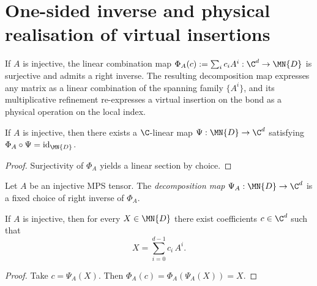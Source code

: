 \section{One-sided inverse and physical realisation of virtual insertions}%
\label{sec:decomposition_map}

If $A$ is injective, the linear combination map
$\Phi_A(c) := \sum_{i} c_i A^i : \C^d \to \MN{D}$
is surjective and admits a right inverse. The resulting decomposition map
expresses any matrix as a linear combination of the spanning family
$\{A^i\}$, and its multiplicative refinement re-expresses a virtual insertion
on the bond as a physical operation on the local index.

\begin{lemma}\label{lem:exists_rightInverse}
    \leanok
    If $A$ is injective, then there exists a $\C$-linear map
    $\Psi : \MN{D} \to \C^d$ satisfying
    $\Phi_A \circ \Psi = \mathrm{id}_{\MN{D}}$.
\end{lemma}

\begin{proof}
    \leanok
    Surjectivity of $\Phi_A$ yields a linear section by choice.
\end{proof}

\begin{definition}\label{def:decomposition_map}
    \leanok
    Let $A$ be an injective MPS tensor.
    The \emph{decomposition map} $\Psi_A : \MN{D} \to \C^d$ is a
    fixed choice of right inverse of $\Phi_A$.
\end{definition}

\begin{lemma}\label{lem:exists_decomposition}
    \leanok
    If $A$ is injective, then for every $X \in \MN{D}$ there exist
    coefficients $c \in \C^d$ such that
    \[
        X = \sum_{i=0}^{d-1} c_i\, A^i.
    \]
\end{lemma}

\begin{proof}
    \leanok
    Take $c = \Psi_A(X)$.
    Then $\Phi_A(c) = \Phi_A(\Psi_A(X)) = X$.
\end{proof}

